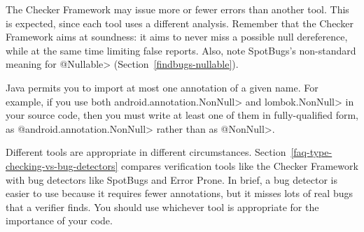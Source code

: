 

The Checker Framework may issue more or fewer errors than another tool.
This is expected, since each tool uses a different analysis.  Remember that
the Checker Framework aims at soundness:  it aims to never miss a possible
null dereference, while at the same time limiting false reports.  Also,
note SpotBugs's non-standard meaning for \<@Nullable>
(Section~\ref{findbugs-nullable}).

Java permits you to import at most one annotation of a given name.  For
example, if you use both \<android.annotation.NonNull> and
\<lombok.NonNull> in your source code, then you must write at least one of
them in fully-qualified form, as \<@android.annotation.NonNull> rather than
as \<@NonNull>.



Different tools are appropriate in different circumstances.
Section~\ref{faq-type-checking-vs-bug-detectors} compares verification
tools like the Checker Framework with bug detectors like SpotBugs and Error
Prone.  In brief, a bug detector is easier to use because it requires fewer
annotations, but it misses lots of real bugs that a verifier finds.  You
should use whichever tool is appropriate for the importance of your code.

